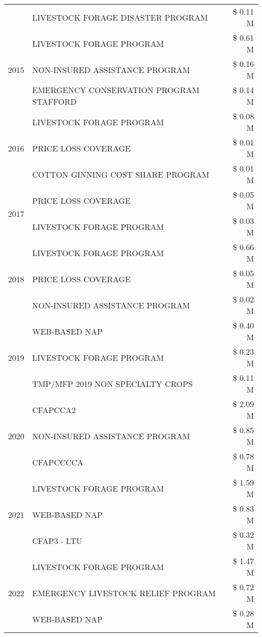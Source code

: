 \begin{tabular}{llr}
 & LIVESTOCK FORAGE DISASTER PROGRAM & \$ 0.11 M \\
\cline{1-3}
\multirow[t]{3}{*}{2015} & LIVESTOCK FORAGE PROGRAM & \$ 0.61 M \\
 & NON-INSURED ASSISTANCE PROGRAM & \$ 0.16 M \\
 & EMERGENCY CONSERVATION PROGRAM STAFFORD & \$ 0.14 M \\
\cline{1-3}
\multirow[t]{3}{*}{2016} & LIVESTOCK FORAGE PROGRAM & \$ 0.08 M \\
 & PRICE LOSS COVERAGE & \$ 0.01 M \\
 & COTTON GINNING COST SHARE PROGRAM & \$ 0.01 M \\
\cline{1-3}
\multirow[t]{2}{*}{2017} & PRICE LOSS COVERAGE & \$ 0.05 M \\
 & LIVESTOCK FORAGE PROGRAM & \$ 0.03 M \\
\cline{1-3}
\multirow[t]{3}{*}{2018} & LIVESTOCK FORAGE PROGRAM & \$ 0.66 M \\
 & PRICE LOSS COVERAGE & \$ 0.05 M \\
 & NON-INSURED ASSISTANCE PROGRAM & \$ 0.02 M \\
\cline{1-3}
\multirow[t]{3}{*}{2019} & WEB-BASED NAP & \$ 0.40 M \\
 & LIVESTOCK FORAGE PROGRAM & \$ 0.23 M \\
 & TMP/MFP 2019 NON SPECIALTY CROPS & \$ 0.11 M \\
\cline{1-3}
\multirow[t]{3}{*}{2020} & CFAPCCA2 & \$ 2.09 M \\
 & NON-INSURED ASSISTANCE PROGRAM & \$ 0.85 M \\
 & CFAPCCCCA & \$ 0.78 M \\
\cline{1-3}
\multirow[t]{3}{*}{2021} & LIVESTOCK FORAGE PROGRAM & \$ 1.59 M \\
 & WEB-BASED NAP & \$ 0.83 M \\
 & CFAP3 - LTU & \$ 0.32 M \\
\cline{1-3}
\multirow[t]{3}{*}{2022} & LIVESTOCK FORAGE PROGRAM & \$ 1.47 M \\
 & EMERGENCY LIVESTOCK RELIEF PROGRAM & \$ 0.72 M \\
 & WEB-BASED NAP & \$ 0.28 M \\
\cline{1-3}
\bottomrule
\end{tabular}

